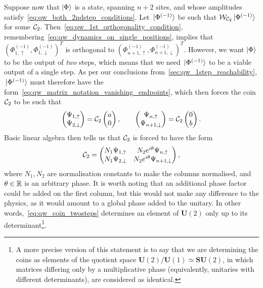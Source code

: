 Suppose now that $\ket\Phi$ is a state, spanning $n+2$ sites, and whose amplitudes satisfy~\cref{eq:qw_both_2ndstep_conditions}.
Let $\ket*{\Phi^{(-1)}}$ be such that ${\mathcal{W}}_{{\mathcal{C}}_2}\ket*{\Phi^{(-1)}}$ for some ${\mathcal{C}}_2$.
Then~\cref{eq:qw_1st_orthogonality_condition}, remembering~\cref{eq:qw_dynamics_on_single_positions}, implies that
$(\Phi^{(-1)}_{1,\uparrow},\Phi^{(-1)}_{1,\downarrow})^T$
is orthogonal to
$(\Phi^{(-1)}_{n+1,\uparrow},\Phi^{(-1)}_{n+1,\downarrow})^T$.
However, we want $\ket\Phi$ to be the output of \textit{two} steps, which means that we need $\ket*{\Phi^{(-1)}}$ to be a viable output of a single step. As per our conclusions from~\cref{sec:qw_1step_reachability}, $\ket*{\Phi^{(-1)}}$ must therefore have the form~\cref{eq:qw_matrix_notation_vanishing_endpoints}, which then forces the coin ${\mathcal{C}}_2$ to be such that
\begin{equation}
    \begin{pmatrix}
        \Psi_{1,\uparrow} \\ \Psi_{2,\downarrow}
    \end{pmatrix} =
    {\mathcal{C}}_2 \begin{pmatrix}
        a \\ 0
    \end{pmatrix},
    \qquad
    \begin{pmatrix}
        \Psi_{n,\uparrow} \\ \Psi_{n+1,\downarrow}
    \end{pmatrix} =
    {\mathcal{C}}_2 \begin{pmatrix}
        0 \\ b
    \end{pmatrix}.
\end{equation}
Basic linear algebra then tells us that ${\mathcal{C}}_2$ is forced to have the form
\begin{equation}
    {\mathcal{C}}_2 = \begin{pmatrix}
        N_1 \Psi_{1,\uparrow} & N_2 e^{i\theta} \Psi_{n,\uparrow} \\
        N_1 \Psi_{2,\downarrow} & N_2 e^{i\theta} \Psi_{n+1,\downarrow}
    \end{pmatrix},
    \label{eq:qw_coin_twosteps}
\end{equation}
where $N_1, N_2$ are normalisation constants to make the columns normalised, and $\theta\in\mathbb{R}$ is an arbitrary phase.
It is worth noting that an additional phase factor could be added on the first column, but this would not make any difference to the physics, as it would amount to a global phase added to the unitary. In other words,~\cref{eq:qw_coin_twosteps} determines an element of $\mathbf{U}(2)$ only up to its determinant\footnote{A more precise version of this statement is to say that we are determining the coins as elements of the quotient space $\mathbf{U}(2)/\mathbf U(1)\simeq\mathbf{SU}(2)$, in which matrices differing only by a multiplicative phase (equivalently, unitaries with different determinants), are considered as identical.}.
